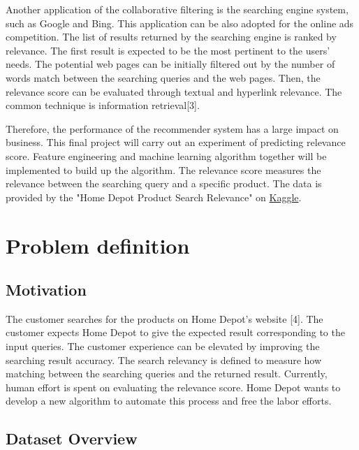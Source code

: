 \documentclass[11pt, titlepage]{article}
\begin{document}
\vspace{3mm} 
Another application of the collaborative filtering is the searching engine system, such as Google and Bing. This application can be also adopted for the online ads competition. The list of results returned by the searching engine is ranked by relevance. The first result is expected to be the most pertinent to the users' needs. The potential web pages can be initially filtered out by the number of words match between the searching queries and the web pages. Then, the relevance score can be evaluated through textual and hyperlink relevance. The common technique is information retrieval[3]. 

\vspace{3mm} 
Therefore, the performance of the recommender system has a large impact on business. This final project will carry out an experiment of predicting relevance score. Feature engineering and machine learning algorithm together will be implemented to build up the algorithm. The relevance score measures the relevance between the searching query and a specific product. The data is provided by the "Home Depot Product Search Relevance" on  \href{<https://www.kaggle.com/c/home-depot-product-search-relevance>}{Kaggle}. 


\section{Problem definition} 


\subsection{Motivation} 

\noindent
The customer searches for the products on Home Depot's website [4]. The customer expects Home Depot to give the expected result corresponding to the input queries. The customer experience can be elevated by improving the searching result accuracy. The search relevancy is defined to measure how matching between the searching queries and the returned result. Currently, human effort is spent on evaluating the relevance score. Home Depot wants to develop a new algorithm to automate this process and free the labor efforts.

\subsection{Dataset Overview} 
\end{document}
